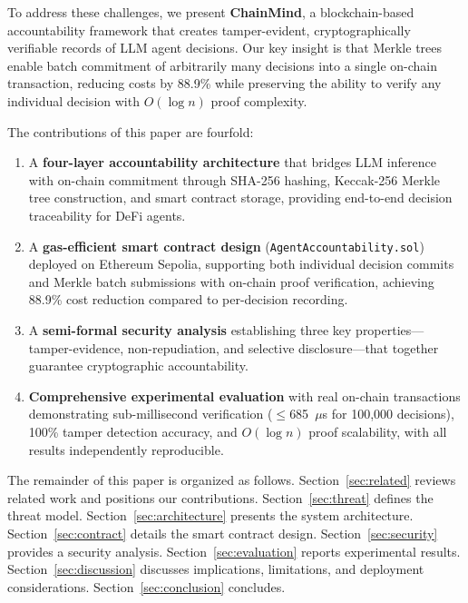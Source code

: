 \documentclass[manuscript,nonacm]{acmart}
\begin{document}
To address these challenges, we present \textbf{ChainMind}, a blockchain-based accountability framework that creates tamper-evident, cryptographically verifiable records of LLM agent decisions.
Our key insight is that Merkle trees enable batch commitment of arbitrarily many decisions into a single on-chain transaction, reducing costs by 88.9\% while preserving the ability to verify any individual decision with $O(\log n)$ proof complexity.

The contributions of this paper are fourfold:

\begin{enumerate}[leftmargin=*]
    \item A \textbf{four-layer accountability architecture} that bridges LLM inference with on-chain commitment through SHA-256 hashing, Keccak-256 Merkle tree construction, and smart contract storage, providing end-to-end decision traceability for DeFi agents.

    \item A \textbf{gas-efficient smart contract design} (\texttt{AgentAccountability.sol}) deployed on Ethereum Sepolia, supporting both individual decision commits and Merkle batch submissions with on-chain proof verification, achieving 88.9\% cost reduction compared to per-decision recording.

    \item A \textbf{semi-formal security analysis} establishing three key properties---tamper-evidence, non-repudiation, and selective disclosure---that together guarantee cryptographic accountability.

    \item \textbf{Comprehensive experimental evaluation} with real on-chain transactions demonstrating sub-millisecond verification ($\leq$685~$\mu$s for 100,000 decisions), 100\% tamper detection accuracy, and $O(\log n)$ proof scalability, with all results independently reproducible.
\end{enumerate}

The remainder of this paper is organized as follows.
Section~\ref{sec:related} reviews related work and positions our contributions.
Section~\ref{sec:threat} defines the threat model.
Section~\ref{sec:architecture} presents the system architecture.
Section~\ref{sec:contract} details the smart contract design.
Section~\ref{sec:security} provides a security analysis.
Section~\ref{sec:evaluation} reports experimental results.
Section~\ref{sec:discussion} discusses implications, limitations, and deployment considerations.
Section~\ref{sec:conclusion} concludes.
\end{document}
